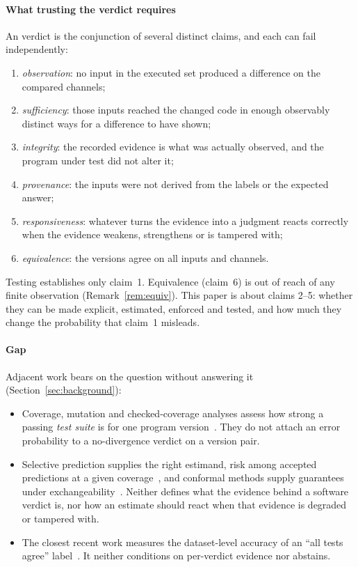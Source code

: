 \paragraph*{What trusting the verdict requires} An \NDO{} verdict is the conjunction of several distinct claims, and each can fail independently:
\begin{enumerate}
\item \emph{observation}: no input in the executed set produced a difference on the compared channels;
\item \emph{sufficiency}: those inputs reached the changed code in enough observably distinct ways for a difference to have shown;
\item \emph{integrity}: the recorded evidence is what was actually observed, and the program under test did not alter it;
\item \emph{provenance}: the inputs were not derived from the labels or the expected answer;
\item \emph{responsiveness}: whatever turns the evidence into a judgment reacts correctly when the evidence weakens, strengthens or is tampered with;
\item \emph{equivalence}: the versions agree on all inputs and channels.
\end{enumerate}
Testing establishes only claim~1. Equivalence (claim~6) is out of reach of any finite observation (Remark~\ref{rem:equiv}). This paper is about claims 2--5: whether they can be made explicit, estimated, enforced and tested, and how much they change the probability that claim~1 misleads.

\paragraph*{Gap} Adjacent work bears on the question without answering it (Section~\ref{sec:background}):
\begin{itemize}
\item Coverage, mutation and checked-coverage analyses assess how strong a passing \emph{test suite} is for one program version~\cite{inozemtseva2014coverage,jia2011analysis,schuler2011assessing}. They do not attach an error probability to a no-divergence verdict on a version pair.
\item Selective prediction supplies the right estimand, risk among accepted predictions at a given coverage~\cite{elyaniv2010foundations,geifman2017selective}, and conformal methods supply guarantees under exchangeability~\cite{angelopoulos2024conformal}. Neither defines what the evidence behind a software verdict is, nor how an estimate should react when that evidence is degraded or tampered with.
\item The closest recent work measures the dataset-level accuracy of an ``all tests agree'' label~\cite{ayub2026semadiff}. It neither conditions on per-verdict evidence nor abstains.
\end{itemize}

